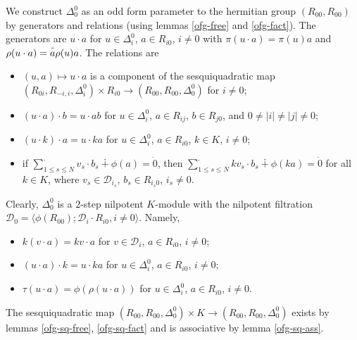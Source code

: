 \documentclass{article}
\theoremstyle{definition}
\newcommand{\inv}[1]{
    \!\;\overline{
        \!\!\:#1\vphantom !\!\!\:
    }\;\!
}
\begin{document}
We construct \(\Delta^0_0\) as an odd form parameter to the hermitian group \((R_{00}, R_{00})\) by generators and relations (using lemmas \ref{ofg-free} and \ref{ofg-fact}). The generators are \(
    u \cdot a
\) for \(u \in \Delta^0_i\), \(a \in R_{i0}\), \(i \neq 0\) with \(
    \pi(u \cdot a) = \pi(u) a
\) and \(
    \rho(u \cdot a) = \inv a \rho(u) a
\). The relations are
\begin{itemize}

    \item \(
        (u, a) \mapsto u \cdot a
    \) is a component of the sesquiquadratic map \(
        (R_{0i}, R_{-i, i}, \Delta^0_i) \times R_{i0}
        \to (R_{00}, R_{00}, \Delta^0_0)
    \) for \(i \neq 0\);

    \item \(
        (u \cdot a) \cdot b = u \cdot ab
    \) for \(u \in \Delta^0_i\), \(a \in R_{ij}\), \(b \in R_{j0}\), and \(
        0 \neq |i| \neq |j| \neq 0
    \);

    \item \(
        (u \cdot k) \cdot a = u \cdot ka
    \) for \(u \in \Delta^0_i\), \(a \in R_{i0}\), \(k \in K\), \(i \neq 0\);

    \item if \(
        \sum_{1 \leq s \leq N}^\cdot v_s \cdot b_s
        \dotplus \phi(a)
        = \dot 0
    \), then \(
        \sum_{1 \leq s \leq N}^\cdot kv_s \cdot b_s
        \dotplus \phi(ka)
        = \dot 0
    \) for all \(k \in K\), where \(v_s \in \mathcal D_{i_s}\), \(b_s \in R_{i_s 0}\), \(i_s \neq 0\).

\end{itemize}

Clearly, \(\Delta^0_0\) is a \(2\)-step nilpotent \(K\)-module with the nilpotent filtration \(
    \mathcal D_0 = \langle
        \phi(R_{00});
        \mathcal D_i \cdot R_{i0}, i \neq 0
    \rangle
\). Namely,
\begin{itemize}

    \item \(
        k(v \cdot a) = kv \cdot a
    \) for \(v \in \mathcal D_i\), \(a \in R_{i0}\), \(i \neq 0\);

    \item \(
        (u \cdot a) \cdot k = u \cdot ka
    \) for \(u \in \Delta^0_i\), \(a \in R_{i0}\), \(i \neq 0\);

    \item \(
        \tau(u \cdot a)
        =
        \phi(\rho(u \cdot a))
    \) for \(u \in \Delta^0_i\), \(a \in R_{i0}\), \(i \neq 0\).

\end{itemize}
The sesquiquadratic map \(
    (R_{00}, R_{00}, \Delta^0_0) \times K
    \to (R_{00}, R_{00}, \Delta^0_0)
\) exists by lemmas \ref{ofg-sq-free}, \ref{ofg-sq-fact} and is associative by lemma \ref{ofg-sq-ass}.
\end{document}
